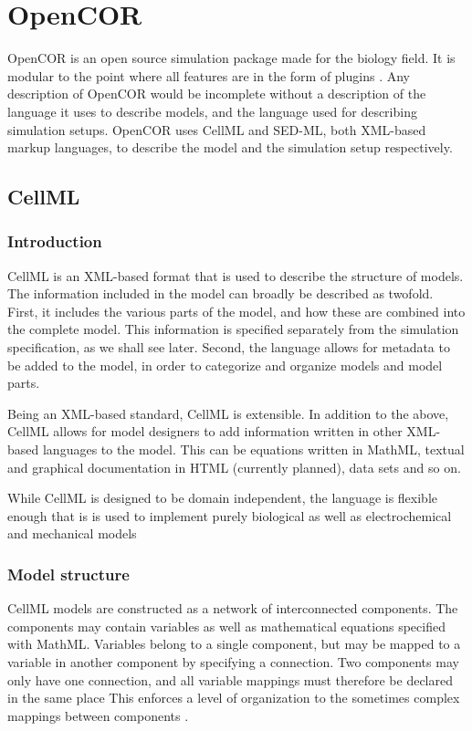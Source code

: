 \documentclass[\rootfolder/main.tex]{subfiles}
\begin{document}
\section{OpenCOR}

OpenCOR is an open source simulation package made for the biology field.
It is modular to the point where all features are in the form of plugins \cite{10.3389/fphys.2015.00026}.
Any description of OpenCOR would be incomplete without a description of the language it uses to describe models, and the language used for describing simulation setups.
OpenCOR uses CellML and SED-ML, both XML-based markup languages, to describe the model and the simulation setup respectively.

\subsection{CellML}


\subsubsection{Introduction}

CellML \cite{cuellar2003} is an XML-based format that is used to describe the structure of models.
The information included in the model can broadly be described as twofold.
First, it includes the various parts of the model, and how these are combined into the complete model.
This information is specified separately from the simulation specification, as we shall see later.
Second, the language allows for metadata to be added to the model, in order to categorize and organize models and model parts.

Being an XML-based standard, CellML is extensible.
In addition to the above, CellML allows for model designers to add information written in other XML-based languages to the model.
This can be equations written in MathML, textual and graphical documentation in HTML (currently planned), data sets and so on.

While CellML is designed to be domain independent, the language is flexible enough that is is used to implement purely biological as well as electrochemical and mechanical models \cite{cuellar2003}

\subsubsection{Model structure}

CellML models are constructed as a network of interconnected components.
The components may contain variables as well as mathematical equations specified with MathML.
Variables belong to a single component, but may be mapped to a variable in another component by specifying a connection.
Two components may only have one connection, and all variable mappings must therefore be declared in the same place
This enforces a level of organization to the sometimes complex mappings between components \cite{cuellar2003}.
\end{document}
